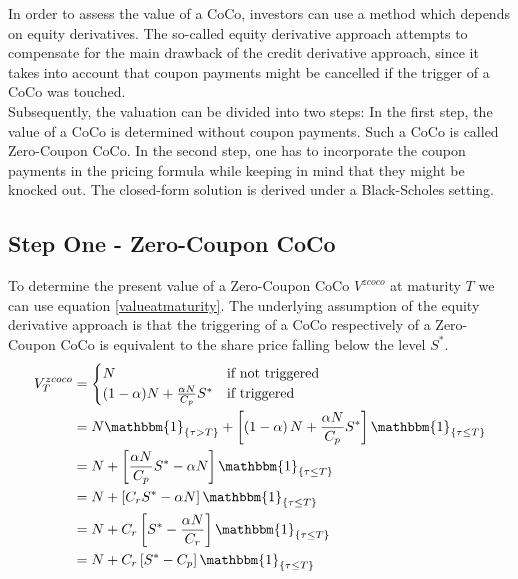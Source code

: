 In order to assess the value of a CoCo, investors can use a method which depends on equity derivatives. \citep{de2011pricing, de2014handbook} The so-called equity derivative approach attempts to compensate for the main drawback of the credit derivative approach, since it takes into account that coupon payments might be cancelled if the trigger of a CoCo was touched.\\

Subsequently, the valuation can be divided into two steps: In the first step, the value of a CoCo is determined without coupon payments. Such a CoCo is called Zero-Coupon CoCo. In the second step, one has to incorporate the coupon payments in the pricing formula while keeping in mind that they might be knocked out. The closed-form solution is derived under a Black-Scholes setting.

\subsection{Step One - Zero-Coupon CoCo}

To determine the present value of a Zero-Coupon CoCo $V^{zcoco}$ at maturity $T$ we can use equation \ref{valueatmaturity}. The underlying assumption of the equity derivative approach is that the triggering of a CoCo respectively of a Zero-Coupon CoCo is equivalent to the share price falling below the level $S^*$. %
\begin{align} \label{pvedcoco}    
    V^{zcoco}_T &= \begin{cases} N & \text{if not triggered}\\ (1 - \alpha) N + \frac{\alpha N}{C_p} S^{*} & \text{if triggered} \end{cases} \nonumber\\
    &= N \mathbbm{1}_{\{ \tau > T \}} +\left[ \left( 1 - \alpha \right) N + \dfrac{\alpha N}{C_p } S^* \right] \mathbbm{1}_{\{ \tau \leq T \}}\nonumber\\
    &= N + \left[ \dfrac{\alpha N}{C_p} S^* - \alpha N \right] \mathbbm{1}_{\{ \tau \leq T \}}\nonumber\\
    &= N + \left[ C_r S^* - \alpha N \right] \mathbbm{1}_{\{ \tau \leq T \}}\nonumber\\
    &= N + C_r \left[S^* - \dfrac{\alpha N}{C_r}\right] \mathbbm{1}_{\{ \tau \leq T \}}\nonumber\\
    &= N + C_r \left[ S^* - C_p \right] \mathbbm{1}_{\{ \tau \leq T \}}
\end{align}

